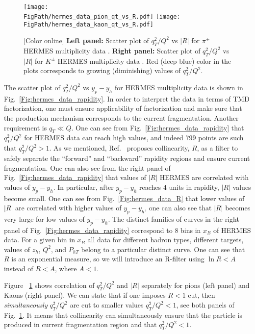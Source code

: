 \documentclass[final,3p,times,onecolumn,sort&compress,hidelinks]{elsarticle}
\newcommand{\xbj}{x_B}
\newcommand*{\FigPath}{../Figs/}%
\begin{document}
\begin{figure}[htb!]
\centering
\texttt{[image: \\FigPath/hermes\_data\_pion\_qt\_vs\_R.pdf]}
\texttt{[image: \\FigPath/hermes\_data\_kaon\_qt\_vs\_R.pdf]}
\caption{\label{Fig:hermes_data_qt_vs_R}
[Color online] {\bf Left panel:} Scatter plot of $q_T^2/Q^2$ vs $|R|$ for $\pi^\pm$ HERMES multiplicity data . {\bf Right panel:} 
Scatter plot of $q_T^2/Q^2$ vs $|R|$ for $K^\pm$ HERMES multiplicity data . Red (deep blue) color in the plots corresponds to growing (diminishing) values of $q_T^2/Q^2$.
}
\end{figure}
The scatter plot of  $q_T^2/Q^2$ vs $y_p-y_h$ for HERMES multiplicity data is shown in Fig.~\ref{Fig:hermes_data_rapidity}. In order to interpret the data in terms of TMD factorization, one must ensure applicability of factorization and make sure that the production mechanism corresponds to the current fragmentation. Another requirement is $q_T \ll Q$. One can see from Fig.~\ref{Fig:hermes_data_rapidity} that  $q_T^2/Q^2$ for HERMES data can reach high values, and indeed 799 points are such that $q_T^2/Q^2>1$. As we mentioned, Ref.~\cite{Boglione:2016bph} proposes collinearity, $R$, as a filter to  safely separate the ``forward'' and ``backward'' rapidity regions and ensure current fragmentation. One can also see from the right panel of Fig.~\ref{Fig:hermes_data_rapidity}  that values of $|R|$ HERMES are correlated with values of $y_p-y_h$. In particular, after $y_p-y_h$ reaches 4 units in rapidity, $|R|$ values become small. One can see from Fig.~\ref{Fig:hermes_data_R} that lower values of $|R|$ are correlated with higher values of $y_p-y_h$, one can also see that $|R|$ becomes very large for low values of $y_p-y_h$. The distinct families of curves in the right panel of Fig.~\ref{Fig:hermes_data_rapidity} correspond to 8 bins in $\xbj$ of HERMES data. For a given bin in $\xbj$ all data for different hadron types, different targets, values of $z_h$, $Q^2$, and $P_{hT}$ belong to a particular distinct curve. One can see that $R$ is an exponential measure, so we will introduce an R-filter using $\ln R < A$ instead of $R < A$, where $A < 1$. 


Figure ~\ref{Fig:hermes_data_qt_vs_R} shows correlation of $q_T^2/Q^2$ and $|R|$ separately for pions (left panel) and Kaons (right panel).
We can state that if one imposes $R<1$-cut, then {\em simultaneously}  $q_T^2/Q^2$ are cut to smaller values $q_T^2/Q^2<1$, see both panels of Fig.~\ref{Fig:hermes_data_qt_vs_R}. It means that collinearity can simultaneously ensure that the particle is produced in current fragmentation region and that $q_T^2/Q^2<1$.
\end{document}
